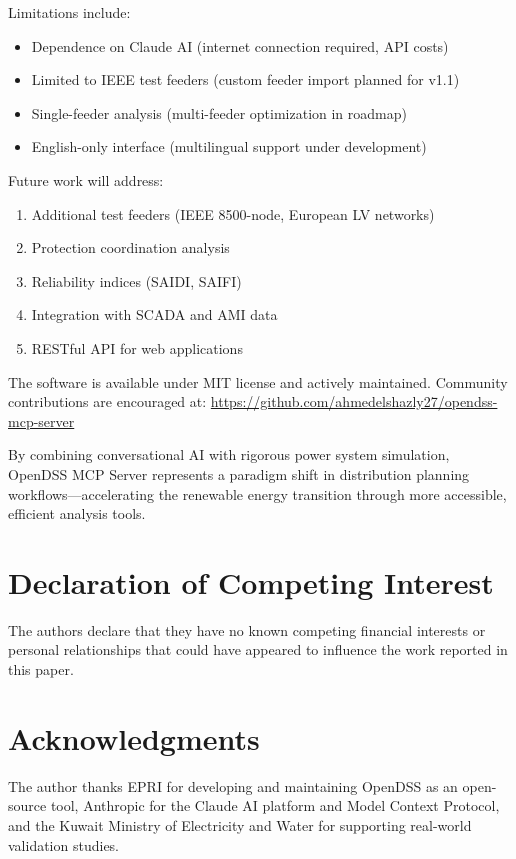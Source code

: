 \documentclass[review]{elsarticle}
\begin{document}
Limitations include:
\begin{itemize}
    \item Dependence on Claude AI (internet connection required, API costs)
    \item Limited to IEEE test feeders (custom feeder import planned for v1.1)
    \item Single-feeder analysis (multi-feeder optimization in roadmap)
    \item English-only interface (multilingual support under development)
\end{itemize}

Future work will address:
\begin{enumerate}
    \item Additional test feeders (IEEE 8500-node, European LV networks)
    \item Protection coordination analysis
    \item Reliability indices (SAIDI, SAIFI)
    \item Integration with SCADA and AMI data
    \item RESTful API for web applications
\end{enumerate}

The software is available under MIT license and actively maintained. Community contributions are encouraged at: \url{https://github.com/ahmedelshazly27/opendss-mcp-server}

By combining conversational AI with rigorous power system simulation, OpenDSS MCP Server represents a paradigm shift in distribution planning workflows—accelerating the renewable energy transition through more accessible, efficient analysis tools.

\section*{Declaration of Competing Interest}

The authors declare that they have no known competing financial interests or personal relationships that could have appeared to influence the work reported in this paper.

\section*{Acknowledgments}

The author thanks EPRI for developing and maintaining OpenDSS as an open-source tool, Anthropic for the Claude AI platform and Model Context Protocol, and the Kuwait Ministry of Electricity and Water for supporting real-world validation studies.
\end{document}
